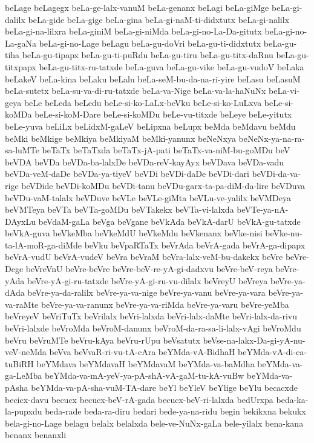 {beLage
beLagegx
beLa-ge-lalx-vanuM
beLa-genanx
beLagi
beLa-giMge
beLa-gi-dalilx
beLa-gide
beLa-gige
beLa-gina
beLa-gi-naM-ti-didxtutx
beLa-gi-nalilx
beLa-gi-na-lilxra
beLa-giniM
beLa-gi-niMda
beLa-gi-no-La-Da-gitutx
beLa-gi-no-La-gaNa
beLa-gi-no-Lage
beLagu
beLa-gu-doVri
beLa-gu-ti-didxtutx
beLa-gu-tiha
beLa-gu-tipapx
beLa-gu-ti-puRdu
beLa-gu-tiru
beLa-gu-titx-daRnu
beLa-gu-titxpapx
beLa-gu-titx-ru-tatxde
beLa-guva
beLa-gu-vike
beLa-gu-vudoV
beLaka
beLakeV
beLa-kina
beLaku
beLalu
beLa-seM-bu-da-na-ri-yire
beLasu
beLasuM
beLa-sutetx
beLa-su-va-di-ru-tatxde
beLa-va-Nige
beLa-va-la-haNuNx
beLa-vi-geya
beLe
beLeda
beLedu
beLe-si-ko-LaLx-beVku
beLe-si-ko-LuLxva
beLe-si-koMDa
beLe-si-koM-Dare
beLe-si-koMDu
beLe-vu-titxde
beLeye
beLe-yitutx
beLe-yuva
beLiLx
beLidxM-gaLeV
beLipxna
beLupx
beMda
beMdavu
beMdu
beMki
beMkige
beMkiya
beMkiyaM
beMki-yanunx
beNeNxya
beNeNx-ya-na-ra-sa-luMTe
beTaTx
beTaTxda
beTaTx-jA-pati
beTaTx-va-niM-bu-goMDu
beV
beVDA
beVDa
beVDa-ba-lalxDe
beVDa-reV-kayAyx
beVDava
beVDa-vadu
beVDa-veM-daDe
beVDa-ya-tiyeV
beVDi
beVDi-daDe
beVDi-dari
beVDi-da-va-rige
beVDide
beVDi-koMDu
beVDi-tanu
beVDu-garx-ta-pa-diM-da-lire
beVDuva
beVDu-vaM-talalx
beVDuve
beVLe
beVLe-giMta
beVLu-ve-yalilx
beVMDeya
beVMTeya
beVTa
beVTa-goMDu
beVTakekx
beVTa-vi-lalxda
beVTe-ya-nA-DAyxLu
beVdaM-gaLa
beVga
beVgane
beVkAda
beVkA-darU
beVkA-gu-tatxde
beVkA-guva
beVkeMba
beVkeMdU
beVkeMdu
beVkenanx
beVke-nisi
beVke-nu-ta-lA-moR-ga-diMde
beVku
beVpaRTaTx
beVrAda
beVrA-gada
beVrA-ga-dipapx
beVrA-vudU
beVrA-vudeV
beVra
beVraM
beVra-lalx-veM-bu-dakekx
beVre
beVre-Dege
beVreVnU
beVre-beVre
beVre-beV-re-yA-gi-dadxvu
beVre-beV-reya
beVre-yAda
beVre-yA-gi-ru-tatxde
beVre-yA-gi-ru-vu-dilalx
beVreyU
beVreya
beVre-ya-dAda
beVre-ya-da-ralilx
beVre-ya-va-nige
beVre-ya-vanu
beVre-ya-vara
beVre-ya-va-raMte
beVre-ya-va-ranunx
beVre-ya-va-riMda
beVre-ya-varu
beVre-yeMba
beVreyeV
beVriTuTx
beVrilalx
beVri-lalxda
beVri-lalx-daMte
beVri-lalx-da-rivu
beVri-lalxde
beVroMda
beVroM-danunx
beVroM-da-ra-sa-li-lalx-vAgi
beVroMdu
beVru
beVruMTe
beVru-kAya
beVru-rUpu
beVsatutx
beVse-na-lakx-Da-gi-yA-nu-veV-neMda
beVva
beVvaR-ri-vu-tA-cAra
beYMda-vA-BidhaH
beYMda-vA-di-ca-tuBiRH
beYMdava
beYMdavaH
beYMdavaM
beYMda-va-baMdha
beYMda-va-ga-LeMba
beYMda-va-mA-yeV-ya-pA-shA-vA-gaM-tu-kA-vuBw
beYMda-va-pAsha
beYMda-va-pA-sha-vuM-TA-dare
beYl
beYleV
beYlige
beYlu
becacxde
becicx-davu
becucx
becucx-beV-rA-gada
becucx-beV-ri-lalxda
bedUrxpa
beda-ka-la-pupxdu
beda-rade
beda-ra-diru
bedari
bede-ya-na-ridu
begin
bekikxna
bekukx
bela-gi-no-Lage
belagu
belalx
belalxda
bele-ve-NuNx-gaLa
bele-yilalx
bena-kana
benanx
benanxli
}
